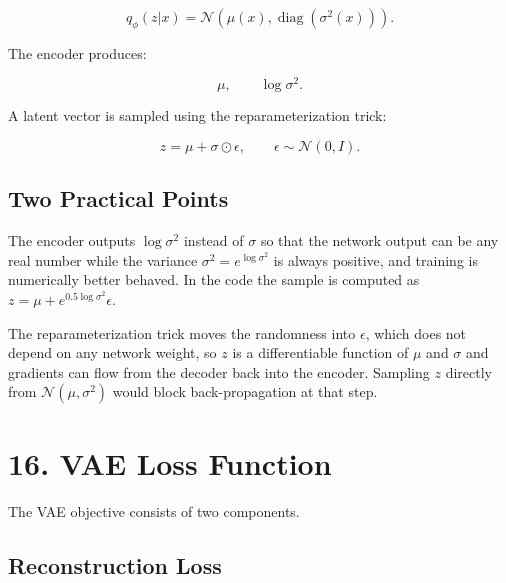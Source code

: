 \documentclass[10pt]{article}
\begin{document}
\[
q_{\phi}(z|x)
=
\mathcal{N}
\left(
\mu(x),
\operatorname{diag}(\sigma^2(x))
\right).
\]

The encoder produces:

\[
\mu,\qquad \log\sigma^2.
\]

A latent vector is sampled using the reparameterization trick:

\[
z=\mu+\sigma\odot\epsilon,
\qquad
\epsilon\sim\mathcal{N}(0,I).
\]

\begin{center}
\end{center}

\subsection*{Two Practical Points}

The encoder outputs $\log\sigma^2$ instead of $\sigma$ so that the network
output can be any real number while the variance $\sigma^2=e^{\log\sigma^2}$ is
always positive, and training is numerically better behaved. In the code the
sample is computed as $z=\mu+e^{0.5\log\sigma^2}\epsilon$.

The reparameterization trick moves the randomness into $\epsilon$, which does not
depend on any network weight, so $z$ is a differentiable function of $\mu$ and
$\sigma$ and gradients can flow from the decoder back into the encoder. Sampling
$z$ directly from $\mathcal{N}(\mu,\sigma^2)$ would block back-propagation at
that step.

\section*{16. VAE Loss Function}

The VAE objective consists of two components.

\subsection*{Reconstruction Loss}
\end{document}
